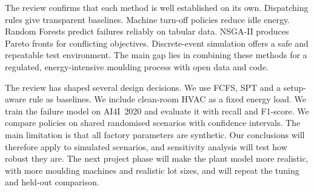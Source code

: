 \documentclass[11pt,a4paper]{article}
\begin{document}
The review confirms that each method is well established on its own. Dispatching rules give transparent baselines. Machine turn-off policies reduce idle energy. Random Forests predict failures reliably on tabular data. NSGA-II produces Pareto fronts for conflicting objectives. Discrete-event simulation offers a safe and repeatable test environment. The main gap lies in combining these methods for a regulated, energy-intensive moulding process with open data and code.

The review has shaped several design decisions. We use FCFS, SPT and a setup-aware rule as baselines. We include clean-room HVAC as a fixed energy load. We train the failure model on AI4I~2020 and evaluate it with recall and F1-score. We compare policies on shared randomised scenarios with confidence intervals. The main limitation is that all factory parameters are synthetic. Our conclusions will therefore apply to simulated scenarios, and sensitivity analysis will test how robust they are. The next project phase will make the plant model more realistic, with more moulding machines and realistic lot sizes, and will repeat the tuning and held-out comparison.
\end{document}
